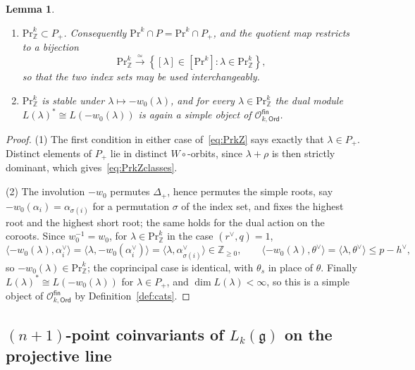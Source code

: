 \documentclass[12pt,a4paper,reqno]{amsart}
\numberwithin{equation}{section}
\newtheorem{lemma}[theorem]{Lemma}
\theoremstyle{definition}
\newcommand{\g}{\mathfrak{g}}
\newcommand{\Z}{\mathbb{Z}}
\def\O{\mathcal{O}}
\def\Ord{\mathsf{Ord}}
\def\fin{\mathsf{fin}}
\def\Pr{\mathrm{Pr}}
\def\la{\lambda}
\def \al{\alpha}
\def\<{\langle}
\def\>{\rangle}
\def\si{\sigma}
\def\moduli{\overline{\mathcal{M}}_{g,n}}
\def\coinv{\mathbb{V}(V;M^\bullet)}
\begin{document}
\begin{lemma}\label{lm:w0closed}
\begin{enumerate}
\item $\Pr^k_\Z\subset P_+$. Consequently $\Pr^k\cap P=\Pr^k\cap P_+$, and the quotient map restricts to a bijection
\begin{equation}\label{eq:PrkZclasses}
\Pr^k_\Z\xrightarrow{\ \simeq\ }\left\{[\la]\in[\Pr^k]:\la\in \Pr^k_\Z\right\},
\end{equation}
so that the two index sets may be used interchangeably.
\item $\Pr^k_\Z$ is stable under $\la\mapsto -w_0(\la)$, and for every $\la\in \Pr^k_\Z$ the dual module $L(\la)^\ast\cong L(-w_0(\la))$ is again a simple object of $\O^\fin_{k,\Ord}$.
\end{enumerate}
\end{lemma}
\begin{proof}
(1) The first condition in either case of~\eqref{eq:PrkZ} says exactly that $\la\in P_+$. Distinct elements of $P_+$ lie in distinct $W\circ$-orbits, since $\la+\rho$ is then strictly dominant, which gives~\eqref{eq:PrkZclasses}.

(2) The involution $-w_0$ permutes $\Delta_+$, hence permutes the simple roots, say $-w_0(\al_i)=\al_{\si(i)}$ for a permutation $\si$ of the index set, and fixes the highest root and the highest short root; the same holds for the dual action on the coroots. Since $w_0^{-1}=w_0$, for $\la\in \Pr^k_\Z$ in the case $(r^\vee,q)=1$,
\[
\<-w_0(\la),\al^\vee_i\>=\<\la,-w_0(\al^\vee_i)\>=\<\la,\al_{\si(i)}^\vee\>\in \Z_{\geq 0},\qquad
\<-w_0(\la),\theta^\vee\>=\<\la,\theta^\vee\>\leq p-h^\vee,
\]
so $-w_0(\la)\in \Pr^k_\Z$; the coprincipal case is identical, with $\theta_s$ in place of $\theta$. Finally $L(\la)^\ast\cong L(-w_0(\la))$ for $\la\in P_+$, and $\dim L(\la)<\infty$, so this is a simple object of $\O^\fin_{k,\Ord}$ by Definition~\ref{def:cats}.
\end{proof}

\subsection{$(n+1)$-point coinvariants of $L_k(\g)$ on the projective line}





    
\end{document}
